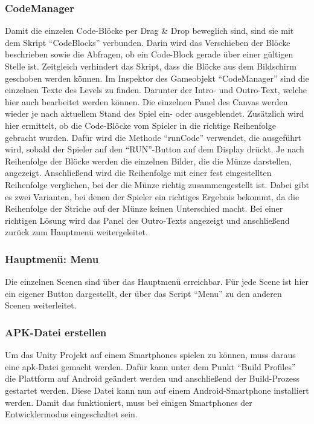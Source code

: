 \subsubsection*{CodeManager}
Damit die einzelen Code-Blöcke per Drag \& Drop beweglich sind, sind sie mit dem Skript “CodeBlocks” verbunden. Darin wird das Verschieben der Blöcke beschrieben sowie die Abfragen, ob ein Code-Block gerade über einer gültigen Stelle ist. Zeitgleich verhindert das Skript, dass die Blöcke aus dem Bildschirm geschoben werden können.
Im Inspektor des Gameobjekt “CodeManager” sind die einzelnen Texte des Levels zu finden. Darunter der Intro- und Outro-Text, welche hier auch bearbeitet werden können. Die einzelnen Panel des Canvas werden wieder je nach aktuellem Stand des Spiel ein- oder ausgeblendet. Zusätzlich wird hier ermittelt, ob die Code-Blöcke vom Spieler in die richtige Reihenfolge gebracht wurden. Dafür wird die Methode “runCode” verwendet, die ausgeführt wird, sobald der Spieler auf den “RUN”-Button auf dem Display drückt. Je nach Reihenfolge der Blöcke werden die einzelnen Bilder, die die Münze darstellen, angezeigt. Anschließend wird die Reihenfolge mit einer fest eingestellten Reihenfolge verglichen, bei der die Münze richtig zusammengestellt ist. Dabei gibt es zwei Varianten, bei denen der Spieler ein richtiges Ergebnis bekommt, da die Reihenfolge der Striche auf der Münze keinen Unterschied macht. Bei einer richtigen Lösung wird das Panel des Outro-Texts angezeigt und anschließend zurück zum Hauptmenü weitergeleitet.

\subsubsection{Hauptmenü: Menu}
Die einzelnen Scenen sind über das Hauptmenü erreichbar. Für jede Scene ist hier ein eigener Button dargestellt, der über das Script “Menu” zu den anderen Scenen weiterleitet.

\subsubsection{APK-Datei erstellen}
Um das Unity Projekt auf einem Smartphones spielen zu können, muss daraus eine apk-Datei gemacht werden. Dafür kann unter dem Punkt “Build Profiles” die Plattform auf Android geändert werden und anschließend der Build-Prozess gestartet werden. Diese Datei kann nun auf einem Android-Smartphone installiert werden. Damit das funktioniert, muss bei einigen Smartphones der Entwicklermodus eingeschaltet sein.

